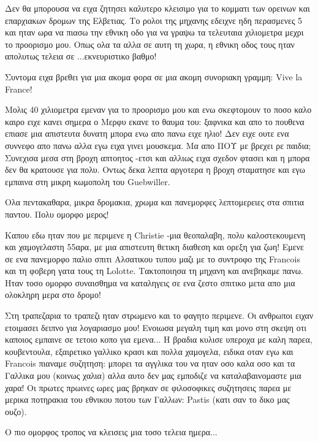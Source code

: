 
Δεν θα μπορουσα να ειχα ζητησει καλυτερο κλεισιμο για το κομματι των ορεινων και επαρχιακων δρομων της Ελβετιας.
Το ρολοι της μηχανης εδειχνε ηδη περασμενες 5 και ηταν ωρα να πιασω την εθνικη οδο για να γραψω τα τελευταια χιλιομετρα μεχρι το προορισμο μου. Οπως ολα τα αλλα σε αυτη τη χωρα, η εθνικη οδος τους ηταν απολυτως τελεια σε ...εκνευριστικο βαθμο!


Συντομα ειχα βρεθει για μια ακομα φορα σε μια ακομη συνοριακη γραμμη: Vive la France!


Μολις 40 χιλιομετρα εμεναν για το προορισμο μου και ενω σκεφτομουν το ποσο καλο καιρο ειχε κανει σημερα ο Μερφυ εκανε το θαυμα του: ξαφνικα και απο το πουθενα επιασε μια απιστευτα δυνατη μπορα ενω απο πανω ειχε ηλιο! Δεν ειχε ουτε ενα συννεφο απο πανω αλλα εγω ειχα γινει μουσκεμα. Μα απο ΠΟΥ με βρεχει ρε παιδια;
Συνεχισα μεσα στη βροχη απτοητος -ετσι και αλλιως ειχα σχεδον φτασει και η μπορα δεν θα κρατουσε για πολυ.
Οντως δεκα λεπτα αργοτερα η βροχη σταματησε και εγω εμπαινα στη μικρη κωμοπολη του Guebwiller.


Ολα πεντακαθαρα, μικρα δρομακια, χρωμα και πανεμορφες λεπτομερειες στα σπιτια παντου. 
Πολυ ομορφο μερος!


Καπου εδω ηταν που με περιμενε η Christie -μια θεοπαλαβη, πολυ καλοστεκουμενη και χαμογελαστη 55αρα, με μια απιστευτη θετικη διαθεση και ορεξη για ζωη! Εμενε σε ενα πανεμορφο παλιο σπιτι Αλσατικου τυπου μαζι με το συντροφο της Francois και τη φοβερη γατα τους τη Lolotte.
Τακτοποιησα τη μηχανη και ανεβηκαμε πανω. Ηταν τοσο ομορφο συναισθημα να καταληγεις σε ενα ζεστο σπιτικο μετα απο μια ολοκληρη μερα στο δρομο!

Στη τραπεζαρια το τραπεζι ηταν στρωμενο και το φαγητο περιμενε. Οι ανθρωποι ειχαν ετοιμασει δειπνο για λογαριασμο μου! Ενοιωσα μεγαλη τιμη και μονο στη σκεψη οτι καποιος εμπαινε σε τετοιο κοπο για εμενα...
Η βραδια κυλισε υπεροχα με καλη παρεα, κουβεντουλα, εξαιρετικο γαλλικο κρασι και πολλα χαμογελα, ειδικα οταν εγω και Francois πιαναμε συζητηση: μπορει τα αγγλικα του να ηταν οσο καλα οσο και τα Γαλλικα μου (κοινως χαλια) αλλα αυτο δεν μας εμποδιζε να καταλαβαινομαστε μια χαρα! 
Οι πρωτες πρωινες ωρες μας βρηκαν σε φιλοσοφικες συζητησεις παρεα με μερικα ποτηρακια του εθνικου ποτου των Γαλλων: Pastis (κατι σαν το δικο μας ουζο).

Ο πιο ομορφος τροπος να κλεισεις μια τοσο τελεια ημερα...
